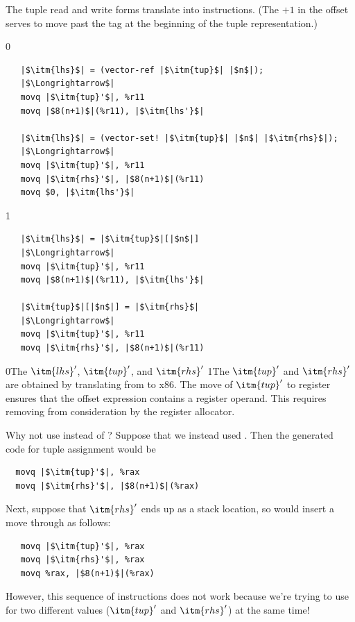 \documentclass[7x10]{TimesAPriori_MIT}%
\def\racketEd{0}
\def\pythonEd{1}
\providecommand{\BookEdition}{1}
\let\edition\BookEdition
\newcommand{\racket}[1]{{\if\edition\racketEd{#1}\fi}}
\newcommand{\pythonColor}[0]{}
\newcommand{\python}[1]{{\if\edition\pythonEd\pythonColor #1\fi}}
\numberwithin{theorem}{chapter}
\numberwithin{definition}{chapter}
\numberwithin{equation}{chapter}
\begin{document}
The tuple read and write forms translate into 
instructions.  (The $+1$ in the offset serves to move past the tag at the
beginning of the tuple representation.)
%
\begin{center}
\begin{minipage}{\textwidth}
{\if\edition\racketEd    
\begin{lstlisting}
   |$\itm{lhs}$| = (vector-ref |$\itm{tup}$| |$n$|);
   |$\Longrightarrow$|
   movq |$\itm{tup}'$|, %r11
   movq |$8(n+1)$|(%r11), |$\itm{lhs'}$|

   |$\itm{lhs}$| = (vector-set! |$\itm{tup}$| |$n$| |$\itm{rhs}$|);
   |$\Longrightarrow$|
   movq |$\itm{tup}'$|, %r11
   movq |$\itm{rhs}'$|, |$8(n+1)$|(%r11)
   movq $0, |$\itm{lhs'}$|
\end{lstlisting}
\fi}
{\if\edition\pythonEd\pythonColor    
\begin{lstlisting}
   |$\itm{lhs}$| = |$\itm{tup}$|[|$n$|]
   |$\Longrightarrow$|
   movq |$\itm{tup}'$|, %r11
   movq |$8(n+1)$|(%r11), |$\itm{lhs'}$|

   |$\itm{tup}$|[|$n$|] = |$\itm{rhs}$|
   |$\Longrightarrow$|
   movq |$\itm{tup}'$|, %r11
   movq |$\itm{rhs}'$|, |$8(n+1)$|(%r11)
\end{lstlisting}
\fi}
\end{minipage}
\end{center}
\racket{The $\itm{lhs}'$, $\itm{tup}'$, and $\itm{rhs}'$}
\python{The $\itm{tup}'$ and $\itm{rhs}'$}
are obtained by translating from \LangCVec{} to x86.
%
The move of $\itm{tup}'$ to
register  ensures that the offset expression
 contains a register operand.  This requires
removing  from consideration by the register allocator.

Why not use  instead of ? Suppose that we instead used
. Then the generated code for tuple assignment would be
\begin{lstlisting}
  movq |$\itm{tup}'$|, %rax
  movq |$\itm{rhs}'$|, |$8(n+1)$|(%rax)
\end{lstlisting}
Next, suppose that $\itm{rhs}'$ ends up as a stack location, so
 would insert a move through 
as follows:
\begin{lstlisting}
   movq |$\itm{tup}'$|, %rax
   movq |$\itm{rhs}'$|, %rax
   movq %rax, |$8(n+1)$|(%rax)
\end{lstlisting}
However, this sequence of instructions does not work because we're
trying to use  for two different values ($\itm{tup}'$ and
$\itm{rhs}'$) at the same time!
\end{document}
